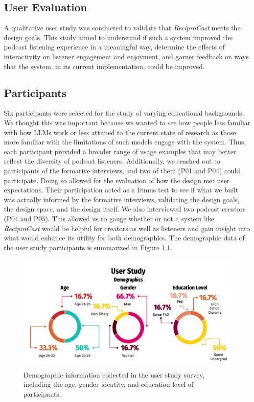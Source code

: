 \documentclass[12pt]{report}
\begin{document}
\begin{myfont}
        \clearpage

        \chapter{User Evaluation}
        A qualitative user study was conducted to validate that \textit{ReciproCast} meets the design goals. This study aimed to understand if such a system improved the podcast listening experience in a meaningful way, determine the effects of interactivity on listener engagement and enjoyment, and garner feedback on ways that the system, in its current implementation, could be improved.
        
        \section{Participants}
        Six participants were selected for the study of varying educational backgrounds. We thought this was important because we wanted to see how people less familiar with how LLMs work or less attuned to the current state of research as those more familiar with the limitations of such models engage with the system. Thus, each participant provided a broader range of usage examples that may better reflect the diversity of podcast listeners. Additionally, we reached out to participants of the formative interviews, and two of them (P01 and P04) could participate. Doing so allowed for the evaluation of how the design met user expectations. Their participation acted as a litmus test to see if what we built was actually informed by the formative interviews, validating the design goals, the design space, and the design itself. We also interviewed two podcast creators (P04 and P05). This allowed us to gauge whether or not a system like \textit{ReciproCast} would be helpful for creators as well as listeners and gain insight into what would enhance its utility for both demographics. The demographic data of the user study participants is summarized in Figure \ref{fig:userdemographics}.
        
        \begin{figure}[H]
        \centering
          \includegraphics[width=1\textwidth]{figures/userstudydemog.png}
          \caption{Demographic information collected in the user study survey, including the age, gender identity, and education level of participants.}
          \label{fig:userdemographics}
        \end{figure}


\end{myfont}
\end{document}
